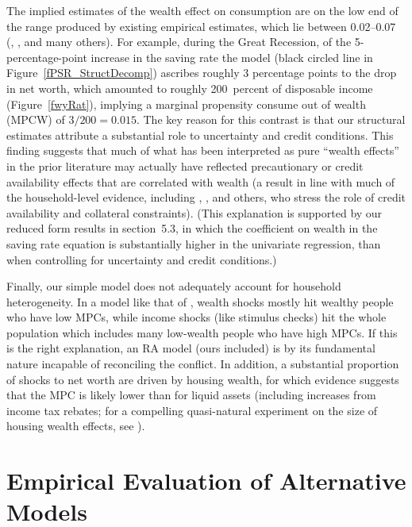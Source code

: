 \documentclass[titlepage]{\econtex}
\begin{document}
The implied estimates of the wealth effect on consumption are on the low end  of the range produced by existing empirical estimates, which lie between 0.02--0.07 (\cite{cos11}, \cite{mrsBalance}, \cite{BergerEtAl:HPandC} and many others).
For example, during the Great Recession, of the 5-percentage-point increase in the saving rate the model (black circled line in Figure~\ref{fPSR_StructDecomp}) ascribes roughly 3 percentage points  to the drop in net worth, which amounted to roughly 200~percent of disposable income (Figure~\ref{fwyRat}), implying a marginal propensity consume out of wealth (MPCW) of $3/200=0.015$. The key reason for this contrast is that our structural estimates attribute a substantial role to uncertainty and credit conditions. This finding suggests that much of what has been interpreted as pure ``wealth effects'' in the prior literature may actually have reflected precautionary or credit availability effects that are correlated with wealth (a result in line with much of the household-level evidence, including \cite{hurstStafford}, \cite{cooper_housingCollateral}, \cite{asWealthEffect}  and others, who stress the role of credit availability and collateral constraints). (This explanation is supported by our reduced form results in section~5.3, in which the coefficient on wealth in the saving rate equation is substantially higher in the univariate regression, than when controlling for uncertainty and credit conditions.)

Finally, our simple model does not adequately account for household heterogeneity.  In a model like that of \cite{cstwMPC}, wealth shocks mostly hit wealthy people who have low MPCs, while income shocks (like stimulus checks) hit the whole population which includes many low-wealth people who have high MPCs.  If this is the right explanation, an RA model (ours included) is by its fundamental nature incapable of reconciling the conflict. In addition, a substantial proportion of shocks to net worth are driven by housing wealth, for which evidence suggests that the MPC is likely lower than for liquid assets (including increases from income tax rebates; for a compelling quasi-natural experiment on the size of housing wealth effects, see \cite{ktvHousingWealthEffect}).


\hypertarget{sReducedFormRegressions}{}

\section{Empirical Evaluation of Alternative Models} \label{sReducedFormRegressions}
\end{document}
